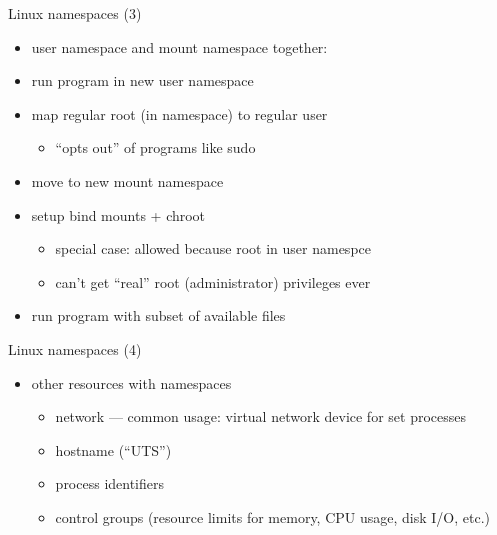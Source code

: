 \begin{frame}{Linux namespaces (3)}
    \begin{itemize}
    \item user namespace and mount namespace together:
    \vspace{.5cm}
    \item run program in new user namespace
    \item map regular root (in namespace) to regular user
        \begin{itemize}
        \item ``opts out'' of programs like sudo
        \end{itemize}
    \item move to new mount namespace
    \item setup bind mounts + chroot
        \begin{itemize}
        \item special case: allowed because root in user namespce
        \item can't get ``real'' root (administrator) privileges ever
        \end{itemize}
    \item run program with subset of available files
    \end{itemize}
\end{frame}

\begin{frame}{Linux namespaces (4)}
    \begin{itemize}
    \item other resources with namespaces
        \begin{itemize}
        \item network --- common usage: virtual network device for set processes
        \item hostname (``UTS'')
        \item process identifiers
        \item control groups (resource limits for memory, CPU usage, disk I/O, etc.)
        \end{itemize}
    \end{itemize}
\end{frame}

